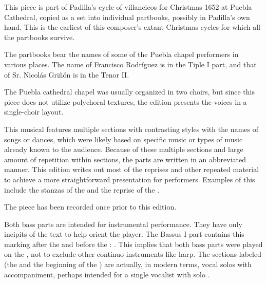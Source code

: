 
\begin{notesources}

\begin{source}
\end{source}

\end{notesources}

This piece is part of Padilla's cycle of villancicos for Christmas 1652 at 
Puebla Cathedral, copied as a set into individual partbooks, possibly in 
Padilla's own hand.%
    \Autocites{Cashner:PadillaRhythm-AMS}[406--462]{Cashner:PhD}
This is the earliest of this composer's extant Christmas cycles for which all 
the partbooks survive.

The partbooks bear the names of some of the Puebla chapel performers in various 
places.
The name of Francisco Rodríguez is in the Tiple I part, and that of Sr. Nicolás 
Griñón is in the Tenor II.

The Puebla cathedral chapel was usually organized in two choirs, but since this 
piece does not utilize polychoral textures, the edition presents the voices in 
a single-choir layout.

This musical  features multiple sections with contrasting styles
with the names of songs or dances, which were likely based on specific music or
types of music already known to the audience.
Because of these multiple sections and large amount of repetition within 
sections, the parts are written in an abbreviated manner.
This edition writes out most of the reprises and other repeated material to 
achieve a more straightforward presentation for performers.
Examples of this include the stanzas of the  and the 
 reprise of the .

The piece has been recorded once prior to this edition.%
  \autocite{Padilla:1652ChristmasCD}


Both bass parts are intended for instrumental performance.
They have only incipits of the text to help orient the player.
The Bassus I part contains this marking after the  and 
before the : .
This implies that both bass parts were played on the , not to 
exclude other continuo instruments like harp.
The sections labeled  (the  and the beginning of the 
) are actually, in modern terms, vocal solos with accompaniment, 
perhaps intended for a single vocalist with solo .

